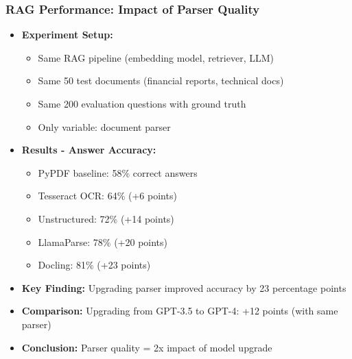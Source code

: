 \begin{frame}[fragile]\frametitle{RAG Performance: Impact of Parser Quality}
      \begin{itemize}
        \item \textbf{Experiment Setup:}
        \begin{itemize}
            \item Same RAG pipeline (embedding model, retriever, LLM)
            \item Same 50 test documents (financial reports, technical docs)
            \item Same 200 evaluation questions with ground truth
            \item Only variable: document parser
        \end{itemize}
        \item \textbf{Results - Answer Accuracy:}
        \begin{itemize}
            \item PyPDF baseline: 58\% correct answers
            \item Tesseract OCR: 64\% (+6 points)
            \item Unstructured: 72\% (+14 points)
            \item LlamaParse: 78\% (+20 points)
            \item Docling: 81\% (+23 points)
        \end{itemize}
        \item \textbf{Key Finding:} Upgrading parser improved accuracy by 23 percentage points
        \item \textbf{Comparison:} Upgrading from GPT-3.5 to GPT-4: +12 points (with same parser)
        \item \textbf{Conclusion:} Parser quality = 2x impact of model upgrade
      \end{itemize}
\end{frame}

